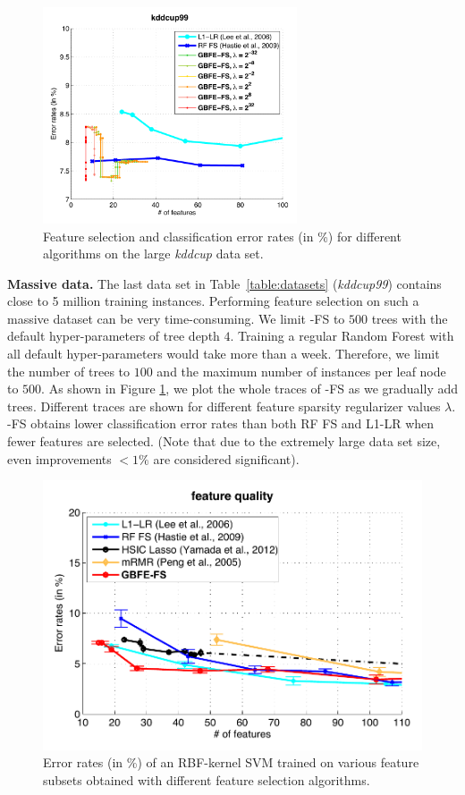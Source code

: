 \begin{figure}[t!!!]
\centerline{
\includegraphics[width = 0.67\textwidth]{plots/largeset_071}
}
\caption{Feature selection and classification error rates (in \%) for different algorithms on the large \emph{kddcup} data set.}
\label{fig:largeset}
\end{figure}

\textbf{Massive data.}
The last data set in Table~\ref{table:datasets} (\emph{kddcup99}) contains close to 5 million training instances. Performing feature selection on such a massive dataset can be very time-consuming. We limit \name{}-FS to $500$ trees with the default hyper-parameters of tree depth $4$. Training a regular Random Forest with all default hyper-parameters would take more than a week. Therefore, we limit the number of trees to $100$ and the maximum number of instances per leaf node to $500$. As shown in Figure \ref{fig:largeset}, we plot the whole traces of \name{}-FS as we gradually add trees. Different traces are shown for different feature sparsity regularizer values $\lambda$. \name{}-FS obtains lower classification error rates than both RF FS and L1-LR when fewer features are selected. (Note that due to the extremely large data set size, even improvements $<1\%$ are considered significant).

\begin{figure}[t!!!]
\centerline{
\includegraphics[width = .75\textwidth]{plots/feature_quality}
}
\caption{Error rates (in \%) of an RBF-kernel SVM trained on various feature subsets obtained with different feature selection algorithms.}
\label{fig:quality}
\end{figure}


